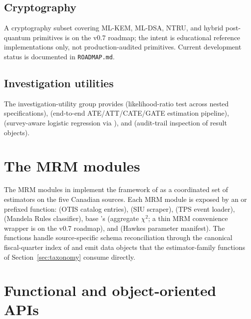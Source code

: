 \documentclass[article,shortnames,nojss]{jss}
\begin{document}
\subsection{Cryptography}

A cryptography subset covering ML-KEM, ML-DSA, NTRU, and hybrid
post-quantum primitives is on the v0.7 roadmap; the intent is
educational reference implementations only, not production-audited
primitives. Current development status is documented in
\texttt{ROADMAP.md}.

\subsection{Investigation utilities}

The investigation-utility group provides
 (likelihood-ratio test
across nested specifications),
 (end-to-end
ATE/ATT/CATE/GATE estimation pipeline),
 (survey-aware logistic
regression via ), and 
(audit-trail inspection of result objects).

\section{The MRM modules}
\label{sec:mrm}

The MRM modules in  implement the framework of
\citet{Ruhela2026MRM} as a coordinated set of estimators on the
five Canadian sources. Each MRM module is exposed by an  or 
prefixed function:  (OTIS catalog
entries),  (SIU scraper),
 (TPS event loader),
 (Mandela Rules classifier),
base 's  (aggregate $\chi^2$;
a thin MRM convenience wrapper is on the v0.7 roadmap), and
 (Hawkes parameter manifest). The functions handle source-specific
schema reconciliation through the canonical fiscal-quarter index
of \citet{Ruhela2026MRM} and emit data objects that the
estimator-family functions of Section~\ref{sec:taxonomy} consume
directly.

\section{Functional and object-oriented APIs}
\label{sec:api}
\end{document}
